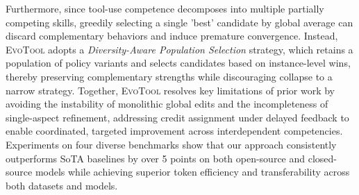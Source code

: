 \documentclass[11pt]{article}
\begin{document}
Furthermore, since tool-use competence decomposes into multiple partially competing skills, greedily selecting a single 'best' candidate by global average can discard complementary behaviors and induce premature convergence. Instead, \textsc{EvoTool} adopts a \textit{Diversity-Aware Population Selection} strategy, which retains a population of policy variants and selects candidates based on instance-level wins, thereby preserving complementary strengths while discouraging collapse to a narrow strategy.
Together, \textsc{EvoTool} resolves key limitations of prior work by avoiding the instability of monolithic global edits and the incompleteness of single-aspect refinement, addressing credit assignment under delayed feedback to enable coordinated, targeted improvement across interdependent competencies. Experiments on four diverse benchmarks show that our approach consistently outperforms SoTA baselines by over 5 points on both open-source and closed-source models while achieving superior token efficiency and transferability across both datasets and models.
\end{document}
